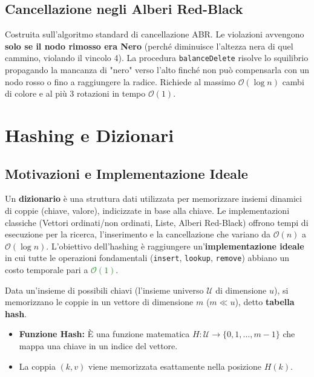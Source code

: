 \documentclass[12pt, a4paper]{article}
\begin{document}
\subsection{Cancellazione negli Alberi Red-Black}
Costruita sull'algoritmo standard di cancellazione ABR.
Le violazioni avvengono \textbf{solo se il nodo rimosso era Nero} (perché diminuisce l'altezza nera di quel cammino, violando il vincolo 4).
La procedura \texttt{balanceDelete} risolve lo squilibrio propagando la mancanza di "nero" verso l'alto finché non può compensarla con un nodo rosso o fino a raggiungere la radice. Richiede al massimo $\mathcal{O}(\log n)$ cambi di colore e al più 3 rotazioni in tempo $\mathcal{O}(1)$.



\section{Hashing e Dizionari}

\subsection{Motivazioni e Implementazione Ideale}
Un \textbf{dizionario} è una struttura dati utilizzata per memorizzare insiemi dinamici di coppie (chiave, valore), indicizzate in base alla chiave.
Le implementazioni classiche (Vettori ordinati/non ordinati, Liste, Alberi Red-Black) offrono tempi di esecuzione per la ricerca, l'inserimento e la cancellazione che variano da $\mathcal{O}(n)$ a $\mathcal{O}(\log n)$.
L'obiettivo dell'hashing è raggiungere un'\textbf{implementazione ideale} in cui tutte le operazioni fondamentali (\texttt{insert}, \texttt{lookup}, \texttt{remove}) abbiano un costo temporale pari a \textcolor{green}{$\mathcal{O}(1)$}.

\begin{tcolorbox}[colback=lightergray!10, colframe=tocsec, title=\textbf{Definizioni Base: Tabella Hash}]
Data un'insieme di possibili chiavi (l'insieme universo $\mathcal{U}$ di dimensione $u$), si memorizzano le coppie in un vettore di dimensione $m$ ($m \ll u$), detto \textbf{tabella hash}.
\begin{itemize}
\item \textbf{Funzione Hash:} È una funzione matematica $H: \mathcal{U} \rightarrow \{0, 1, \dots, m-1\}$ che mappa una chiave in un indice del vettore.
\item La coppia $(k, v)$ viene memorizzata esattamente nella posizione $H(k)$.
\end{itemize}
\end{tcolorbox}
\end{document}
